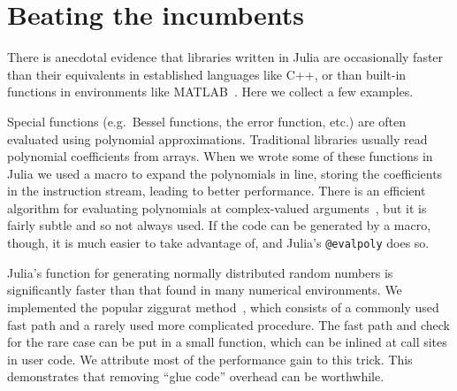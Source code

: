 




\section{Beating the incumbents}
\label{sec:beating}

There is anecdotal evidence that libraries written in Julia are occasionally
faster than their equivalents in established languages like C++, or
than built-in functions in environments like MATLAB~\cite{matlab}.
Here we collect a few examples.

Special functions (e.g.\ Bessel functions, the error function, etc.) are
often evaluated using polynomial approximations.
Traditional libraries usually read polynomial coefficients from arrays.
When we wrote some of these functions in Julia we used a macro
to expand the polynomials in line, storing the coefficients in the
instruction stream, leading to better performance.
There is an efficient algorithm for evaluating polynomials at complex-valued
arguments~\cite{knuth1969art}, but it is fairly subtle and so not always
used.
If the code can be generated by a macro, though, it is much easier to take
advantage of, and Julia's \texttt{@evalpoly} does so.


Julia's function for generating normally distributed random numbers is
significantly faster than that found in many numerical environments.
We implemented the popular ziggurat method~\cite{Marsaglia:Tsang:2000:JSSOBK:v05i08},
which consists of a commonly used fast path and a rarely used more complicated
procedure.
The fast path and check for the rare case can be put in a small function,
which can be inlined at call sites in user code.
We attribute most of the performance gain to this trick.
This demonstrates that removing ``glue code'' overhead can be worthwhile.

